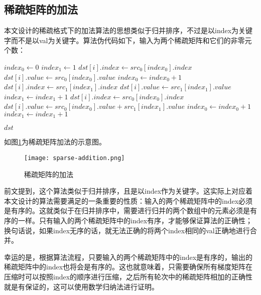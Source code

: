 \subsection{稀疏矩阵的加法}
本文设计的稀疏格式下的加法算法的思想类似于归并排序，不过是以index为关键字而不是以val为关键字。算法伪代码如下，输入为两个稀疏矩阵和它们的非零元个数：
\makeatletter
\def\BState{\State\hskip-\ALG@thistlm}
\makeatother
\begin{algorithm}
\begin{algorithmic}[1]
\State $index_0 \gets 0$
\State $index_1 \gets 1$
\State $dst[i].index \gets src_0[index_0].index$
\State $dst[i].value \gets src_0[index_0].value$
\State $index_0 \gets index_0 + 1$
\State $dst[i].index \gets src_1[index_1].index$
\State $dst[i].value \gets src_1[index_1].value$
\State $index_1 \gets index_1 + 1$
\State $dst[i].index \gets src_0[index_0].index$
\State $dst[i].value \gets src_0[index_0].value + src_1[index_1].value$
\State $index_0 \gets index_0 + 1$
\State $index_1 \gets index_1 + 1$

\EndIf
\EndFor
\State \Return $dst$
\EndProcedure
\end{algorithmic}
\end{algorithm}


如图\ref{fig:sparse-addition}为稀疏矩阵加法的示意图。

\begin{figure}[ht] %
  \centering
  \texttt{[image: sparse-addition.png]}
  \caption{稀疏矩阵的加法}
  \label{fig:sparse-addition}
\end{figure}

前文提到，这个算法类似于归并排序，且是以index作为关键字。这实际上对应着本文设计的算法需要满足的一条重要的性质：输入的两个稀疏矩阵中的index必须是有序的。这就类似于在归并排序中，需要进行归并的两个数组中的元素必须是有序的一样。只有输入的两个稀疏矩阵中的index有序，才能够保证算法的正确性；换句话说，如果index无序的话，就无法正确的将两个index相同的val正确地进行合并。

幸运的是，根据算法流程，只要输入的两个稀疏矩阵中的index是有序的，输出的稀疏矩阵中的index也将会是有序的。这也就意味着，只需要确保所有梯度矩阵在压缩时可以按照index的顺序进行压缩，之后所有轮次中的稀疏矩阵相加的正确性就是有保证的，这可以使用数学归纳法进行证明。

